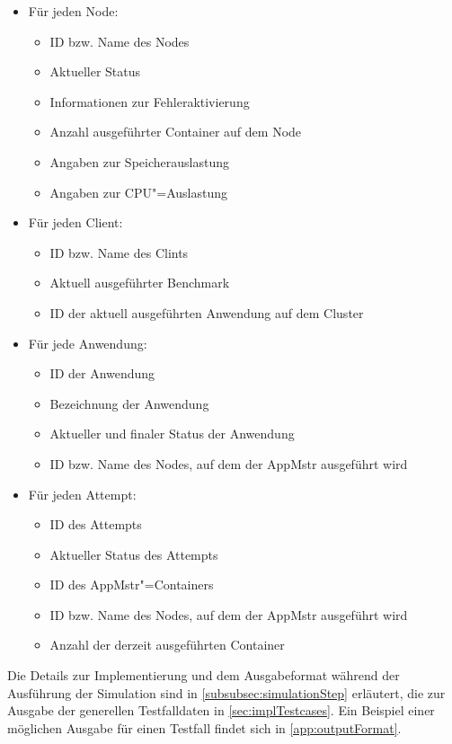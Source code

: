 \begin{itemize}
    \item Für jeden Node:
    \begin{itemize}
        \item ID bzw. Name des Nodes
        \item Aktueller Status
        \item Informationen zur Fehleraktivierung
        \item Anzahl ausgeführter Container auf dem Node
        \item Angaben zur Speicherauslastung
        \item Angaben zur CPU"=Auslastung
    \end{itemize}
    
    \item Für jeden Client:
    \begin{itemize}
        \item ID bzw. Name des Clints
        \item Aktuell ausgeführter Benchmark
        \item ID der aktuell ausgeführten Anwendung auf dem Cluster
    \end{itemize}

    \item Für jede Anwendung:
    \begin{itemize}
        \item ID der Anwendung
        \item Bezeichnung der Anwendung
        \item Aktueller und finaler Status der Anwendung
        \item ID bzw. Name des Nodes, auf dem der \ac{AppMstr} ausgeführt wird
    \end{itemize}

    \item Für jeden Attempt:
    \begin{itemize}
        \item ID des Attempts
        \item Aktueller Status des Attempts
        \item ID des \ac{AppMstr}"=Containers
        \item ID bzw. Name des Nodes, auf dem der \ac{AppMstr} ausgeführt wird
        \item Anzahl der derzeit ausgeführten Container
    \end{itemize}
\end{itemize}

Die Details zur Implementierung und dem Ausgabeformat während der Ausführung der Simulation sind in \cref{subsubsec:simulationStep} erläutert, die zur Ausgabe der generellen Testfalldaten in \cref{sec:implTestcases}. Ein Beispiel einer möglichen Ausgabe für einen Testfall findet sich in \cref{app:outputFormat}.
